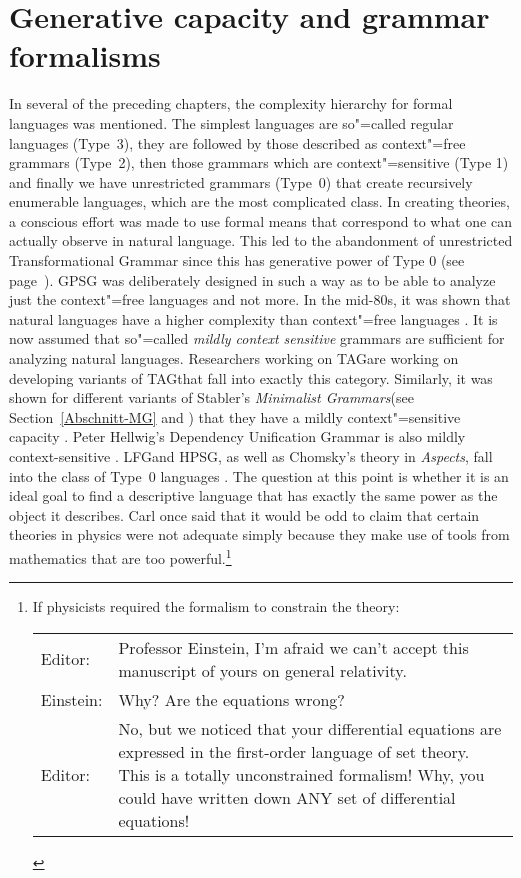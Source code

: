 
\chapter{Generative capacity and grammar formalisms}
\label{sec-generative-capacity}

In several of the preceding chapters,
the complexity hierarchy for formal languages was mentioned. The simplest languages are so"=called regular languages (Type~3),
they are followed by those described as context"=free grammars (Type~2), then those grammars which are 
context"=sensitive (Type 1) and finally we have unrestricted grammars (Type~0) that
create recursively enumerable languages, which are the most complicated class. In creating theories, a conscious effort was made to
use formal means that correspond to what one can actually observe in natural language.
This led to the abandonment of unrestricted Transformational Grammar since this has generative power of Type 0 (see page~\pageref{page-TG-Typ0}).
GPSG was deliberately designed in such a way as to be able to analyze just the context"=free
languages and not more. In the mid-80s, it was shown that natural languages have a higher complexity
than context"=free languages \citep{Shieber85a,Culy85a}. It is now assumed that so"=called
\emph{mildly context sensitive} grammars are sufficient for analyzing natural languages. Researchers
working on TAG\indextag are working on developing variants of TAG\indextag that fall into exactly
this category. Similarly, it was shown for different variants of Stabler's \emph{Minimalist
  Grammars}\indexmg (see Section~\ref{Abschnitt-MG} and \citealp{Stabler2001a,Stabler2010b}) that they
have a mildly context"=sensitive capacity \citep{Michaelis2001a-u}. Peter Hellwig's Dependency
Unification Grammar is also mildly context-sensitive
\citep[]{Hellwig2003a}. 
LFG\indexlfg and HPSG\indexhpsg, as well as Chomsky's theory in \emph{Aspects}, fall into the class of Type~0 languages \citep{Berwick82a-u,Johnson88}.
The question at this point is whether it is an ideal goal to find a descriptive language that has exactly the same power as the object it describes.
Carl \citet{Pollard96a} once said that it would be odd to claim that certain theories in physics were not adequate simply because they make use of tools
from mathematics that are too powerful.\footnote{%
If physicists required the formalism to constrain the theory:\\
\begin{tabular}{@{}l@{~}p{11cm}}
Editor:   & Professor Einstein, I'm afraid we can't accept this manuscript of yours on general relativity.\\
Einstein: & Why? Are the equations wrong?\\
Editor:   & No, but we noticed that your differential equations are
    expressed in the first-order language of set theory. This is
    a totally unconstrained formalism! Why, you could have written
    down ANY set of differential equations! \citep{Pollard96a}
\end{tabular}
}
